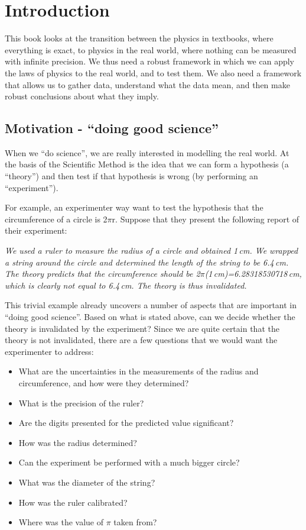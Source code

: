\chapter{Introduction}
\label{chap:Intro}

This book looks at the transition between the physics in textbooks, where everything is exact, to physics in the real world, where nothing can be measured with infinite precision. We thus need a robust framework in which we can apply the laws of physics to the real world, and to test them. We also need a framework that allows us to gather data, understand what the data mean, and then make robust conclusions about what they imply. 

\section{Motivation - ``doing good science''}
When we ``do science'', we are really interested in modelling the real world. At the basis of the Scientific Method is the idea that we can form a hypothesis (a ``theory'') and then test if that hypothesis is wrong (by performing an ``experiment''). 

For example, an experimenter way want to test the hypothesis that the circumference of a circle is 2$\pi$r. Suppose that they present the following report of their experiment:

\textit{We used a ruler to measure the radius of a circle and obtained 1\,cm. We wrapped a string around the circle and determined the length of the string to be 6.4\,cm. The theory predicts that the circumference should be 2$\pi$(1\,cm)=6.28318530718\,cm, which is clearly not equal to 6.4\,cm. The theory is thus invalidated.}

This trivial example already uncovers a number of aspects that are important in ``doing good science''.  Based on what is stated above, can we decide whether the theory is invalidated by the experiment? Since we are quite certain that the theory is not invalidated, there are a few questions that we would want the experimenter to address:
\begin{itemize}
\item What are the uncertainties in the measurements of the radius and circumference, and how were they determined?
\item What is the precision of the ruler?
\item Are the digits presented for the predicted value significant?
\item How was the radius determined?
\item Can the experiment be performed with a much bigger circle? 
\item What was the diameter of the string?
\item How was the ruler calibrated? 
\item Where was the value of $\pi$ taken from?
\end{itemize}

